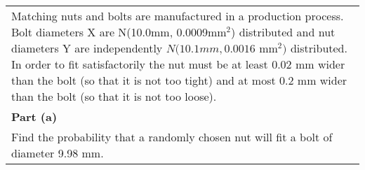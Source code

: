 \documentclass[a4paper,12pt]{article}
\begin{document}
\large
\begin{table}[ht!]
     \centering
     \begin{tabular}{|p{15cm}|}
     \hline        
Matching nuts and bolts are manufactured in a production process.  Bolt diameters X are N(10.0mm, 0.0009mm$^2$) distributed and nut diameters Y are independently $N(10.1mm, 0.0016$ mm$^2)$ distributed. In order to fit  satisfactorily the nut must be at least
0.02 mm wider than the bolt (so that it is not too tight) and at most 0.2 mm wider than
the bolt (so that it is not too loose).
\\
\noindent \textbf{Part (a)}\\
Find the probability that a randomly chosen nut will fit a bolt of diameter 9.98 mm.
\\ \hline
      \end{tabular}
    \end{table}
    
\end{document}
